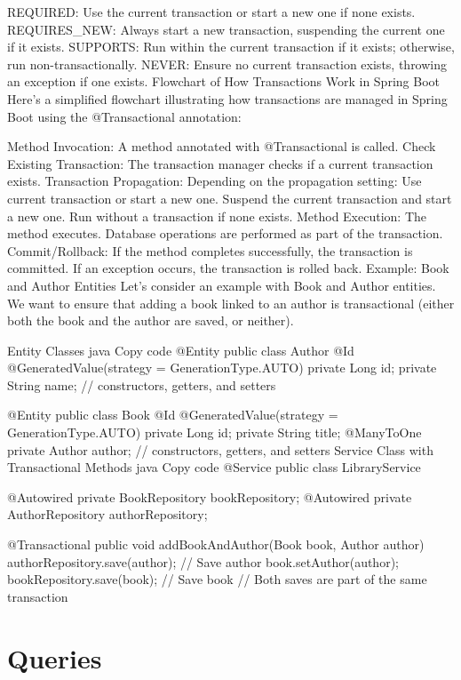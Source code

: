 REQUIRED: Use the current transaction or start a new one if none exists.
REQUIRES\_NEW: Always start a new transaction, suspending the current one if it exists.
SUPPORTS: Run within the current transaction if it exists; otherwise, run non-transactionally.
NEVER: Ensure no current transaction exists, throwing an exception if one exists.
Flowchart of How Transactions Work in Spring Boot
Here’s a simplified flowchart illustrating how transactions are managed in Spring Boot using the @Transactional annotation:

Method Invocation: A method annotated with @Transactional is called.
Check Existing Transaction: The transaction manager checks if a current transaction exists.
Transaction Propagation: Depending on the propagation setting:
Use current transaction or start a new one.
Suspend the current transaction and start a new one.
Run without a transaction if none exists.
Method Execution: The method executes. Database operations are performed as part of the transaction.
Commit/Rollback:
If the method completes successfully, the transaction is committed.
If an exception occurs, the transaction is rolled back.
Example: Book and Author Entities
Let’s consider an example with Book and Author entities. We want to ensure that adding a book linked to an author is transactional (either both the book and the author are saved, or neither).

Entity Classes
java
Copy code
@Entity
public class Author {
    @Id
    @GeneratedValue(strategy = GenerationType.AUTO)
    private Long id;
    private String name;
    // constructors, getters, and setters
}

@Entity
public class Book {
    @Id
    @GeneratedValue(strategy = GenerationType.AUTO)
    private Long id;
    private String title;
    @ManyToOne
    private Author author;
    // constructors, getters, and setters
}
Service Class with Transactional Methods
java
Copy code
@Service
public class LibraryService {
    @Autowired
    private BookRepository bookRepository;
    @Autowired
    private AuthorRepository authorRepository;

    @Transactional
    public void addBookAndAuthor(Book book, Author author) {
        authorRepository.save(author); // Save author
        book.setAuthor(author);
        bookRepository.save(book); // Save book
        // Both saves are part of the same transaction
    }
}

\section{Queries}

